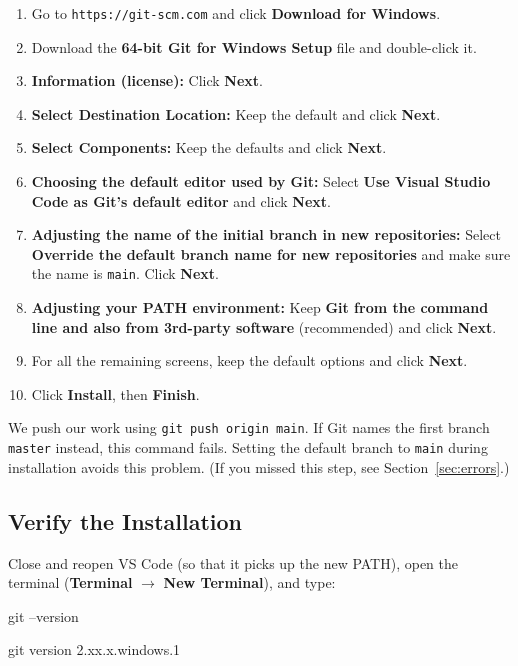 \documentclass[11pt,a4paper]{article}
\newcommand{\code}[1]{\texttt{#1}}
\newcommand{\menu}[1]{\textsf{\textbf{#1}}}
\begin{document}
\begin{enumerate}
\item Go to \code{https://git-scm.com} and click \menu{Download for Windows}.
\item Download the \textbf{64-bit Git for Windows Setup} file and double-click it.
\item \textbf{Information (license):} Click \menu{Next}.
\item \textbf{Select Destination Location:} Keep the default and click \menu{Next}.
\item \textbf{Select Components:} Keep the defaults and click \menu{Next}.
\item \textbf{Choosing the default editor used by Git:} Select \menu{Use Visual Studio Code as Git's default editor} and click \menu{Next}.
\item \textbf{Adjusting the name of the initial branch in new repositories:} Select \menu{Override the default branch name for new repositories} and make sure the name is \code{main}. Click \menu{Next}.
\item \textbf{Adjusting your PATH environment:} Keep \menu{Git from the command line and also from 3rd-party software} (recommended) and click \menu{Next}.
\item For all the remaining screens, keep the default options and click \menu{Next}.
\item Click \menu{Install}, then \menu{Finish}.
\end{enumerate}

\begin{notebox}
We push our work using \code{git push origin main}. If Git names the first branch \code{master} instead, this command fails. Setting the default branch to \code{main} during installation avoids this problem. (If you missed this step, see Section~\ref{sec:errors}.)
\end{notebox}

\subsection{Verify the Installation}

Close and reopen VS Code (so that it picks up the new PATH), open the terminal (\menu{Terminal} $\rightarrow$ \menu{New Terminal}), and type:

\begin{cmd}
git --version
\end{cmd}
\begin{outbox}
git version 2.xx.x.windows.1
\end{outbox}
\end{document}
